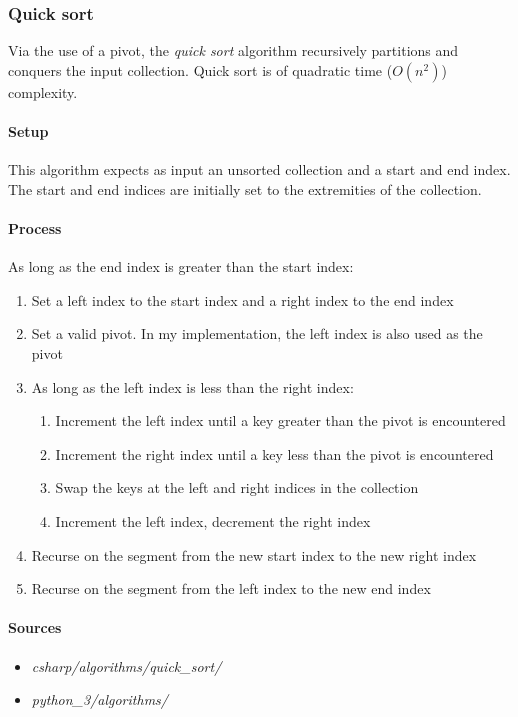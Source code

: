 \documentclass{article}
\begin{document}
\subsubsection{Quick sort}
Via the use of a pivot, the {\em quick sort} algorithm recursively partitions and conquers the input collection.
Quick sort is of quadratic time (\(O(n^2)\)) complexity.

\paragraph{Setup}
This algorithm expects as input an unsorted collection and a start and end index. The start and end indices are
initially set to the extremities of the collection.

\paragraph{Process}
As long as the end index is greater than the start index:
\begin{enumerate}
\item{Set a left index to the start index and a right index to the end index}
\item{Set a valid pivot. In my implementation, the left index is also used as the pivot}
\item{As long as the left index is less than the right index:}
  \begin{enumerate}
  \item{Increment the left index until a key greater than the pivot is encountered}
  \item{Increment the right index until a key less than the pivot is encountered}
  \item{Swap the keys at the left and right indices in the collection}
  \item{Increment the left index, decrement the right index}
  \end{enumerate}
\item{Recurse on the segment from the new start index to the new right index}
\item{Recurse on the segment from the left index to the new end index}
\end{enumerate}

\begin{samepage}
  \paragraph{Sources}
  \begin{itemize}
  \item{{\em csharp/algorithms/quick\_sort/}}
  \item{{\em python\_3/algorithms/}}
  \end{itemize}
\end{samepage}
\end{document}
